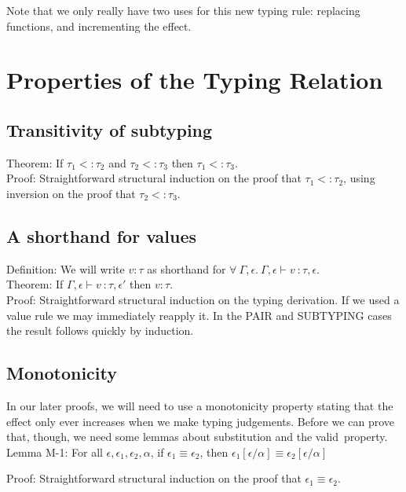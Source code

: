 \documentclass{article}
\newcommand{\oktype}{valid}
\begin{document}
Note that we only really have two uses for this new typing rule: replacing functions, and incrementing the effect.

\section*{Properties of the Typing Relation}

\subsection*{Transitivity of subtyping}
Theorem: If $\tau_1 <: \tau_2$ and $\tau_2 <: \tau_3$ then $\tau_1 <: \tau_3$.
\\

\noindent Proof: Straightforward structural induction on the proof that $\tau_1 <: \tau_2$, using inversion on the proof that $\tau_2 <: \tau_3$.

\subsection*{A shorthand for values}
Definition: We will write $v : \tau$ as shorthand for $\forall\ \Gamma, \epsilon.\ \Gamma, \epsilon \vdash v\ \colon \tau, \epsilon$.
\\

\noindent Theorem: If $\Gamma, \epsilon \vdash v\ \colon \tau, \epsilon'$ then $v : \tau$.
\\

\noindent Proof: Straightforward structural induction on the typing derivation. If we used a value rule we may immediately reapply it. In the PAIR and SUBTYPING cases the result follows quickly by induction.

\subsection*{Monotonicity}
In our later proofs, we will need to use a monotonicity property stating that the effect only ever increases when we make typing judgements. Before we can prove that, though, we need some lemmas about substitution and the \oktype\ property.
\\

\noindent Lemma M-1: For all $\epsilon, \epsilon_1, \epsilon_2, \alpha$, if $\epsilon_1 \equiv \epsilon_2$, then $\epsilon_1[\epsilon/\alpha] \equiv \epsilon_2[\epsilon/\alpha]$

\noindent Proof: Straightforward structural induction on the proof that $\epsilon_1 \equiv \epsilon_2$.
\\
\end{document}
